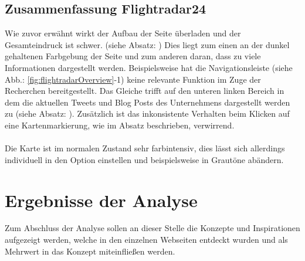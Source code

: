 \documentclass[../Bachelorarbeit.tex]{subfiles}
\begin{document}
\subsection{Zusammenfassung Flightradar24}
Wie zuvor erwähnt wirkt der Aufbau der Seite überladen und der Gesamteindruck ist schwer. (siehe Absatz: ) 
Dies liegt zum einen an der dunkel gehaltenen Farbgebung der Seite und zum anderen daran, dass zu viele Informationen dargestellt werden.
Beispielsweise hat die Navigationsleiste (siehe Abb.: \ref{fig:flightradarOverview}-1) keine relevante Funktion im Zuge der Recherchen bereitgestellt. 
Das Gleiche trifft auf den unteren linken Bereich in dem die aktuellen Tweets und Blog Posts des Unternehmens dargestellt werden zu (siehe Absatz: ). 
Zusätzlich ist das inkonsistente Verhalten beim Klicken auf eine Kartenmarkierung, wie im Absatz  beschrieben, verwirrend. 
\\
\\
Die Karte ist im normalen Zustand sehr farbintensiv, dies lässt sich allerdings individuell in den Option einstellen und beispielsweise in Grautöne abändern.


\section{Ergebnisse der Analyse}
Zum Abschluss der Analyse sollen an dieser Stelle die Konzepte und Inspirationen aufgezeigt werden, welche in den einzelnen Webseiten entdeckt wurden und als Mehrwert in das Konzept miteinfließen werden.
\end{document}
